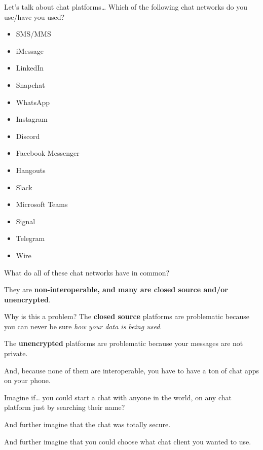 \documentclass{acm}
\begin{document}
\begin{frame}{Let's talk about chat platforms\ldots}
    Which of the following chat networks do you use/have you used?
    \begin{multicols}{2}
        \begin{itemize}[<+->]
            \item SMS/MMS
            \item iMessage
            \item LinkedIn
            \item Snapchat
            \item WhatsApp
            \item Instagram
            \item Discord
            \item Facebook Messenger
            \item Hangouts
            \item Slack
            \item Microsoft Teams
            \item Signal
            \item Telegram
            \item Wire
        \end{itemize}
    \end{multicols}
    \pause[\thebeamerpauses]
    What do all of these chat networks have in common?
    \pause

    They are \textbf{non-interoperable, and many are closed source and/or
    unencrypted}.
\end{frame}

\begin{frame}{Why is this a problem?}
    The \textbf{closed source} platforms are problematic because you can never
    be sure \textit{how your data is being used}.
    \pause

    The \textbf{unencrypted} platforms are problematic because your messages are
    not private.
    \pause

    And, because none of them are interoperable, you have to have a ton of chat
    apps on your phone.
\end{frame}

\begin{frame}{Imagine if\ldots}
    you could start a chat with anyone in the world, on any chat platform just
    by searching their name?
    \pause

    And further imagine that the chat was totally secure.
    \pause

    And further imagine that you could choose what chat client you wanted to
    use.
\end{frame}
\end{document}
